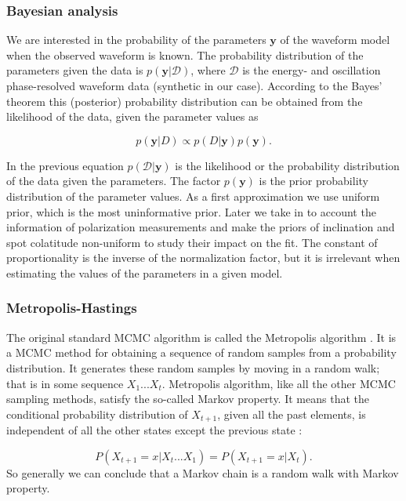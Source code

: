 \documentclass{wihuri}
\def\be{\begin{equation}}
\def\ee{\end{equation}}
\begin{document}
\subsubsection{Bayesian analysis}

We are interested in the probability of the parameters $\textbf{y}$ of the waveform model when the observed waveform is known. The probability distribution of the parameters given the data is $p(\textbf{y}|\mathcal{D})$, where $\mathcal{D}$ is the energy- and oscillation phase-resolved waveform data (synthetic in our case). According to the Bayes' theorem this (posterior) probability distribution can be obtained from the likelihood of the data, given the parameter values as \cite{nattila_bayes}


\be \label{eq:bayes}
p(\textbf{y}|D) \propto p(D|\textbf{y})p(\textbf{y}).
\ee

In the previous equation $p(\mathcal{D}|\textbf{y})$ is the likelihood or the probability distribution of the data given the parameters. The factor $p(\textbf{y})$ is the prior probability distribution of the parameter values. As a first approximation we use uniform prior, which is the most uninformative prior. Later we take in to account the information of polarization measurements and make the priors of inclination and spot colatitude non-uniform to study their impact on the fit. The constant of proportionality is the inverse of the normalization factor, but it is irrelevant when estimating the values of the parameters in a given model. 


\subsubsection{Metropolis-Hastings}

The original standard MCMC algorithm is called the Metropolis algorithm \cite{metropolis53}\cite{hastings70}. %
It is a MCMC method for obtaining a sequence of random samples from a probability distribution. It generates these random samples by moving in a random walk; that is in some sequence $X_{1}...X_{t}$. Metropolis algorithm, like all the other MCMC sampling methods, satisfy the so-called Markov property. It means that the conditional probability distribution of $X_{t+1}$, given all the past elements, is independent of all the other states except the previous state \cite{kaiser}:

 \be \label{eq:markov_prop}
P(X_{t+1} = x|X_{t}. . . X_{1}) = P(X_{t+1} = x|X_{t}).
\ee
So generally we can conclude that a Markov chain is a random walk with Markov property.
 
\end{document}
